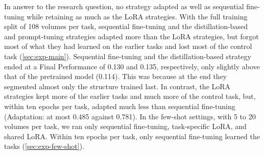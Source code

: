 In answer to the research question, no strategy adapted as well as sequential fine-tuning while retaining as much as the LoRA strategies.
With the full training split of 108 volumes per task, sequential fine-tuning and the distillation-based and prompt-tuning strategies adapted more than the LoRA strategies, but forgot most of what they had learned on the earlier tasks and lost most of the control task (\cref{sec:exp-main}).
Sequential fine-tuning and the distillation-based strategy ended at a Final Performance of 0.130 and 0.135, respectively, only slightly above that of the pretrained model (0.114).
This was because at the end they segmented almost only the structure trained last.
In contrast, the LoRA strategies kept more of the earlier tasks and much more of the control task, but, within ten epochs per task, adapted much less than sequential fine-tuning (Adaptation: at most 0.485 against 0.781).
In the few-shot settings, with 5 to 20 volumes per task, we ran only sequential fine-tuning, task-specific LoRA, and shared LoRA.
Within ten epochs per task, only sequential fine-tuning learned the tasks (\cref{sec:exp-few-shot}).

